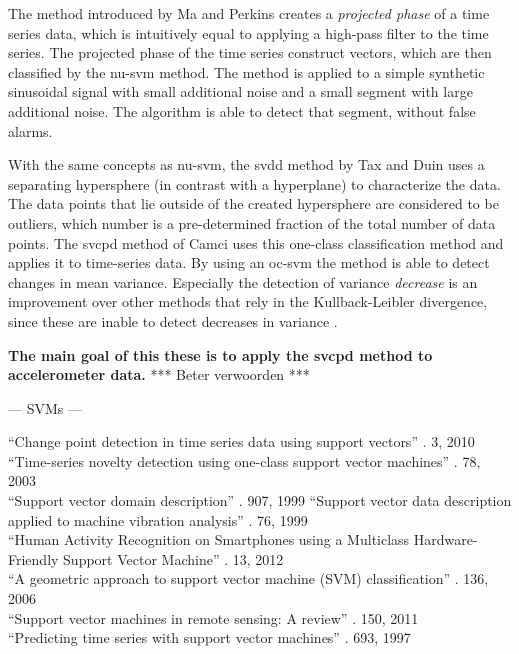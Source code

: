 The method introduced by Ma and Perkins \cite{ma2003time} creates a \emph{projected phase} of a time series data, which is intuitively equal to applying a high-pass filter to the time series.
The projected phase of the time series construct vectors, which are then classified by the \gls{nu-svm} method.
The method is applied to a simple synthetic sinusoidal signal with small additional noise and a small segment with large additional noise.
The algorithm is able to detect that segment, without false alarms.

With the same concepts as \gls{nu-svm}, the \gls{svdd} method by Tax and Duin \cite{tax1999support,tax2004support} uses a separating hypersphere (in contrast with a hyperplane) to characterize the data.
The data points that lie outside of the created hypersphere are considered to be outliers, which number is a pre-determined fraction of the total number of data points.
The \gls{svcpd} method of Camci \cite{camci2010change} uses this one-class classification method and applies it to time-series data.
By using an \gls{oc-svm} the method is able to detect changes in mean variance.
Especially the detection of variance \emph{decrease} is an improvement over other methods that rely in the Kullback-Leibler divergence, since these are inable to detect decreases in variance \cite{takeuchi2006unifying}.

\textbf{The main goal of this these is to apply the \gls{svcpd} method to accelerometer data.}
*** Beter verwoorden ***

--- SVMs ---

``Change point detection in time series data using support vectors'' \cite{camci2010change}. 3, 2010 \\

``Time-series novelty detection using one-class support vector machines'' \cite{ma2003time}. 78, 2003 \\

``Support vector domain description'' \cite{tax1999support}. 907, 1999
``Support vector data description applied to machine vibration analysis'' \cite{tax1999supportdata}. 76, 1999 \\

``Human Activity Recognition on Smartphones using a Multiclass Hardware-Friendly Support Vector Machine'' \cite{anguitahuman}. 13, 2012 \\

``A geometric approach to support vector machine (SVM) classification'' \cite{mavroforakis2006geometric}. 136, 2006 \\

``Support vector machines in remote sensing: A review'' \cite{mountrakis2011support}. 150, 2011 \\

``Predicting time series with support vector machines'' \cite{muller1997predicting}. 693, 1997 \\

